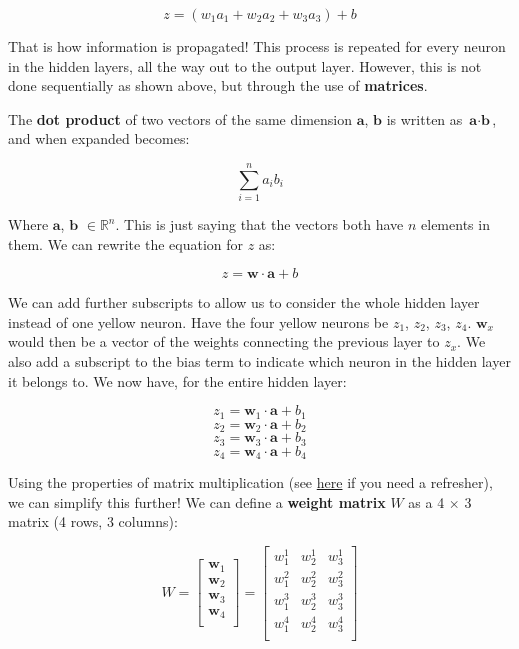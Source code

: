     $$z = (w_1a_1 + w_2a_2 + w_3a_3) + b$$

    That is how information is propagated! This process is repeated for every neuron in the hidden layers, all the way out to the output layer. However, this is not done sequentially as shown above, but through the use of \textbf{matrices}.

    The \textbf{dot product} of two vectors of the same dimension $\textbf{a}$, $\textbf{b}$ is written as $\textbf{a} \cdot \textbf{b}$, and when expanded becomes:

    $$\sum_{i=1}^n a_ib_i$$

    Where $\textbf{a}$, $\textbf{b}$ $\in \mathbb{R}^n$. This is just saying that the vectors both have $n$ elements in them. We can rewrite the equation for $z$ as:

    $$z = \textbf{w}\cdot\textbf{a} + b$$

    We can add further subscripts to allow us to consider the whole hidden layer instead of one yellow neuron. Have the four yellow neurons be $z_1$, $z_2$, $z_3$, $z_4$. $\textbf{w}_x$ would then be a vector of the weights connecting the previous layer to $z_x$. We also add a subscript to the bias term to indicate which neuron in the hidden layer it belongs to. We now have, for the entire hidden layer:

    $$z_1 = \textbf{w}_1\cdot\textbf{a} + b_1$$
    $$z_2 = \textbf{w}_2\cdot\textbf{a} + b_2$$
    $$z_3 = \textbf{w}_3\cdot\textbf{a} + b_3$$
    $$z_4 = \textbf{w}_4\cdot\textbf{a} + b_4$$

    Using the properties of matrix multiplication (see \href{https://www.mathsisfun.com/algebra/matrix-multiplying.html}{here} if you need a refresher), we can simplify this further! We can define a \textbf{weight matrix} $W$ as a 4 $\times$ 3 matrix (4 rows, 3 columns):

    $$W = \begin{bmatrix}
            \textbf{w}_1\\
            \textbf{w}_2\\
            \textbf{w}_3\\
            \textbf{w}_4\\
            \end{bmatrix} = \begin{bmatrix}
                            w^1_1 & w^1_2 & w^1_3 \\
                            w^2_1 & w^2_2 & w^2_3 \\
                            w^3_1 & w^3_2 & w^3_3 \\
                            w^4_1 & w^4_2 & w^4_3 \\
                            \end{bmatrix}$$

